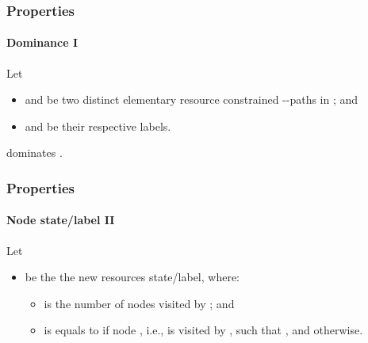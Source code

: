 \begin{frame}
  \frametitle{Properties}
  \framesubtitle{Dominance I}
  Let
  \begin{itemize}
    \item {} and  be two distinct elementary resource constrained --paths in ; and
    \item {} and  be their respective labels.
  \end{itemize}
  \begin{definition}
     dominates .
  \end{definition}
\end{frame}

\begin{frame}
  \frametitle{Properties}
  \framesubtitle{Node state/label II}
  Let
  \begin{itemize}
    \item {} be the the  new resources state/label, where:
    \begin{itemize}
      \item {} is the number of nodes visited by ; and 
      \item {} is equals to  if node , i.e.,  is visited by , such that , and  otherwise.
    \end{itemize}
  \end{itemize}
\end{frame}

